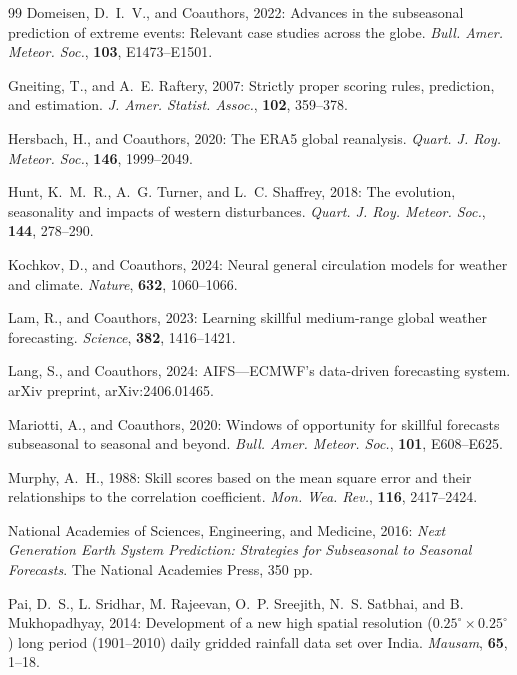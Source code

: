 \documentclass[11pt]{article}
\begin{document}
\begin{thebibliography}{99}
Domeisen, D.~I.~V., and Coauthors, 2022: Advances in the subseasonal
prediction of extreme events: Relevant case studies across the globe.
\textit{Bull. Amer. Meteor. Soc.}, \textbf{103}, E1473--E1501. %

Gneiting, T., and A.~E. Raftery, 2007: Strictly proper scoring rules,
prediction, and estimation. \textit{J. Amer. Statist. Assoc.},
\textbf{102}, 359--378.

Hersbach, H., and Coauthors, 2020: The ERA5 global reanalysis.
\textit{Quart. J. Roy. Meteor. Soc.}, \textbf{146}, 1999--2049.

Hunt, K.~M.~R., A.~G. Turner, and L.~C. Shaffrey, 2018: The evolution,
seasonality and impacts of western disturbances. \textit{Quart. J.
Roy. Meteor. Soc.}, \textbf{144}, 278--290.

Kochkov, D., and Coauthors, 2024: Neural general circulation models
for weather and climate. \textit{Nature}, \textbf{632}, 1060--1066.

Lam, R., and Coauthors, 2023: Learning skillful medium-range global
weather forecasting. \textit{Science}, \textbf{382}, 1416--1421.

Lang, S., and Coauthors, 2024: AIFS---ECMWF's data-driven forecasting
system. arXiv preprint, arXiv:2406.01465. %

Mariotti, A., and Coauthors, 2020: Windows of opportunity for skillful
forecasts subseasonal to seasonal and beyond. \textit{Bull. Amer.
Meteor. Soc.}, \textbf{101}, E608--E625.

Murphy, A.~H., 1988: Skill scores based on the mean square error and
their relationships to the correlation coefficient. \textit{Mon. Wea.
Rev.}, \textbf{116}, 2417--2424.

National Academies of Sciences, Engineering, and Medicine, 2016:
\textit{Next Generation Earth System Prediction: Strategies for
Subseasonal to Seasonal Forecasts}. The National Academies Press,
350 pp. %

Pai, D.~S., L. Sridhar, M. Rajeevan, O.~P. Sreejith, N.~S. Satbhai,
and B. Mukhopadhyay, 2014: Development of a new high spatial
resolution ($0.25^{\circ} \times 0.25^{\circ}$) long period
(1901--2010) daily gridded rainfall data set over India.
\textit{Mausam}, \textbf{65}, 1--18.


\end{thebibliography}
\end{document}

